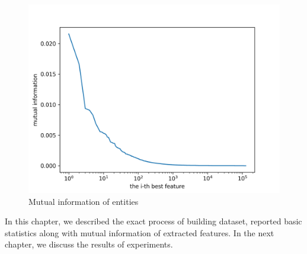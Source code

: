 \begin{figure}[ht]\centering
\includegraphics[width=130mm]{figures/entities.png}
\caption{Mutual information of entities}\label{fig:mi_entities}
\end{figure}


In this chapter, we described the exact process of building dataset,
reported basic statistics along with mutual information of extracted features.
In the next chapter, we discuss the results of experiments.
